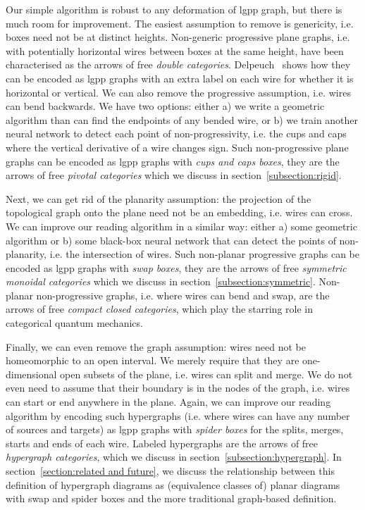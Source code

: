 Our simple algorithm is robust to any deformation of lgpp graph, but there is much room for improvement.
The easiest assumption to remove is genericity, i.e. boxes need not be at distinct heights.
Non-generic progressive plane graphs, i.e. with potentially horizontal wires between boxes at the same height, have been characterised as the arrows of free \emph{double categories}.
Delpeuch~\cite{Delpeuch20} shows how they can be encoded as lgpp graphs with an extra label on each wire for whether it is horizontal or vertical.
We can also remove the progressive assumption, i.e. wires can bend backwards.
We have two options: either a) we write a geometric algorithm than can find the endpoints of any bended wire, or b) we train another neural network to detect each point of non-progressivity, i.e. the cups and caps where the vertical derivative of a wire changes sign.
Such non-progressive plane graphs can be encoded as lgpp graphs with \emph{cups and caps boxes}, they are the arrows of free \emph{pivotal categories} which we discuss in section~\ref{subsection:rigid}.

Next, we can get rid of the planarity assumption: the projection of the topological graph onto the plane need not be an embedding, i.e. wires can cross.
We can improve our reading algorithm in a similar way: either a) some geometric algorithm or b) some black-box neural network that can detect the points of non-planarity, i.e. the intersection of wires.
Such non-planar progressive graphs can be encoded as lgpp graphs with \emph{swap boxes}, they are the arrows of free \emph{symmetric monoidal categories} which we discuss in section~\ref{subsection:symmetric}.
Non-planar non-progressive graphs, i.e. where wires can bend and swap, are the arrows of free \emph{compact closed categories}, which play the starring role in categorical quantum mechanics.

Finally, we can even remove the graph assumption: wires need not be homeomorphic to an open interval.
We merely require that they are one-dimensional open subsets of the plane, i.e. wires can split and merge.
We do not even need to assume that their boundary is in the nodes of the graph, i.e. wires can start or end anywhere in the plane.
Again, we can improve our reading algorithm by encoding such hypergraphs (i.e. where wires can have any number of sources and targets) as lgpp graphs with \emph{spider boxes} for the splits, merges, starts and ends of each wire.
Labeled hypergraphs are the arrows of free \emph{hypergraph categories}, which we discuss in section~\ref{subsection:hypergraph}.
In section~\ref{section:related and future}, we discuss the relationship between this definition of hypergraph diagrams as (equivalence classes of) planar diagrams with swap and spider boxes and the more traditional graph-based definition.
